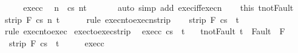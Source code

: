 \begin{isabellebody}
%
\isadelimproof
%
\endisadelimproof
%
\isatagproof
{}\isamarkupfalse%
\ {\isacharminus}\isanewline
\ \ \isamarkupfalse%
\ exec{\isacharunderscore}c\ \isamarkupfalse%
\ n\ \ {\isachardoublequoteopen}{\isasymGamma}{\isasymturnstile}{\isasymlangle}c{\isacharcomma}s{\isasymrangle}\ {\isacharequal}n{\isasymRightarrow}t{\isachardoublequoteclose}\ \isanewline
\ \ \ \ \isamarkupfalse%
\ {\isacharparenleft}auto\ simp\ add{\isacharcolon}\ exec{\isacharunderscore}iff{\isacharunderscore}execn{\isacharparenright}\isanewline
\ \ \isamarkupfalse%
\ this\ t{\isacharunderscore}not{\isacharunderscore}Fault\isanewline
\ \ \isamarkupfalse%
\ {\isachardoublequoteopen}strip\ F\ {\isasymGamma}{\isasymturnstile}{\isasymlangle}c{\isacharcomma}s{\isasymrangle}\ {\isacharequal}n{\isasymRightarrow}\ t{\isachardoublequoteclose}\isanewline
\ \ \ \ \isamarkupfalse%
\ {\isacharparenleft}rule\ execn{\isacharunderscore}to{\isacharunderscore}execn{\isacharunderscore}strip{\isacharparenright}\isanewline
\ \ \isamarkupfalse%
\ {\isachardoublequoteopen}strip\ F\ {\isasymGamma}{\isasymturnstile}{\isasymlangle}c{\isacharcomma}s{\isasymrangle}\ {\isasymRightarrow}\ t{\isachardoublequoteclose}\isanewline
\ \ \ \ \isamarkupfalse%
\ {\isacharparenleft}rule\ execn{\isacharunderscore}to{\isacharunderscore}exec{\isacharparenright}\isanewline
{}\isamarkupfalse%
%
\endisatagproof
{\isafoldproof}%
%
\isadelimproof
\isanewline
%
\endisadelimproof
\isanewline
{}\isamarkupfalse%
\ exec{\isacharunderscore}to{\isacharunderscore}exec{\isacharunderscore}strip{\isacharprime}{\isacharcolon}\isanewline
\ \ exec{\isacharunderscore}c{\isacharcolon}\ {\isachardoublequoteopen}{\isasymGamma}{\isasymturnstile}{\isasymlangle}c{\isacharcomma}s{\isasymrangle}\ {\isasymRightarrow}\ t{\isachardoublequoteclose}\ \isanewline
\ \ t{\isacharunderscore}not{\isacharunderscore}Fault{\isacharcolon}\ {\isachardoublequoteopen}t\ {\isasymnotin}\ Fault\ {\isacharbackquote}\ F{\isachardoublequoteclose}\isanewline
\ \ {\isachardoublequoteopen}strip\ F\ {\isasymGamma}{\isasymturnstile}{\isasymlangle}c{\isacharcomma}s{\isasymrangle}\ {\isasymRightarrow}\ t{\isachardoublequoteclose}\isanewline
%
\isadelimproof
%
\endisadelimproof
%
\isatagproof
{}\isamarkupfalse%
\ {\isacharminus}\isanewline
\ \ \isamarkupfalse%
\ exec{\isacharunderscore}c\ \isamarkupfalse%

\end{isabellebody}
